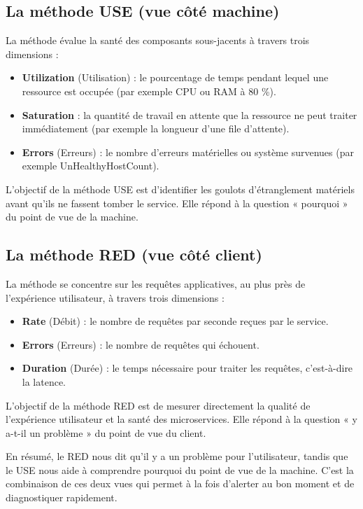 \subsection{La méthode USE (vue côté machine)}

La méthode  évalue la santé des composants sous-jacents à travers trois dimensions :

\begin{itemize}
	\item \textbf{Utilization} (Utilisation) : le pourcentage de temps pendant lequel une ressource est occupée (par exemple CPU ou RAM à 80 \%).
	\item \textbf{Saturation} : la quantité de travail en attente que la ressource ne peut traiter immédiatement (par exemple la longueur d'une file d'attente).
	\item \textbf{Errors} (Erreurs) : le nombre d'erreurs matérielles ou système survenues (par exemple UnHealthyHostCount).
\end{itemize}

L'objectif de la méthode USE est d'identifier les goulots d'étranglement matériels avant qu'ils ne
fassent tomber le service. Elle répond à la question « pourquoi » du point de vue de la machine.

\subsection{La méthode RED (vue côté client)}

La méthode  se concentre sur les requêtes applicatives, au plus près de
l'expérience utilisateur, à travers trois dimensions :

\begin{itemize}
	\item \textbf{Rate} (Débit) : le nombre de requêtes par seconde reçues par le service.
	\item \textbf{Errors} (Erreurs) : le nombre de requêtes qui échouent.
	\item \textbf{Duration} (Durée) : le temps nécessaire pour traiter les requêtes, c'est-à-dire la latence.
\end{itemize}

L'objectif de la méthode RED est de mesurer directement la qualité de l'expérience utilisateur et la
santé des microservices. Elle répond à la question « y a-t-il un problème » du point de vue du client.

En résumé, le RED nous dit qu'il y a un problème pour l'utilisateur, tandis que le USE nous aide à
comprendre pourquoi du point de vue de la machine. C'est la combinaison de ces deux vues qui
permet à la fois d'alerter au bon moment et de diagnostiquer rapidement.

